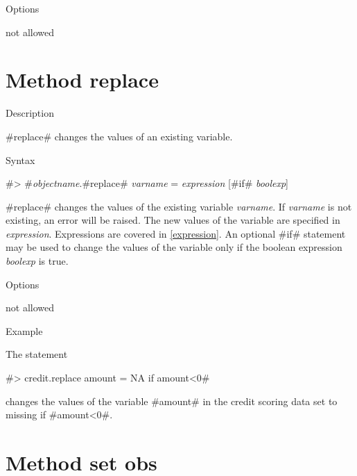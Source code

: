 \begin{stanza}{Options}

not allowed

\end{stanza}

\clearpage



\section{Method replace}
\label{replace} 



\begin{stanza}{Description}

{#replace# changes the values of an existing variable.}
\end{stanza}


\begin{stanza}{Syntax}

{#> #{\em objectname}.#replace# {\em varname} = {\em expression} [#if# {\em boolexp}]

#replace# changes the values of the existing variable {\em
varname}. If {\em varname} is not existing, an error will be
raised. The new values of the variable are specified in {\em
expression}. Expressions are covered in \autoref{expression}. An
optional #if# statement may be used to change the values of the
variable only if the boolean expression {\em boolexp} is true.}
\end{stanza}


\begin{stanza}{Options}

{not allowed}
\end{stanza}


\begin{stanza}{Example}

{The statement

#> credit.replace amount = NA if amount<0#

changes the values of the variable #amount# in the credit scoring
data set to missing if #amount<0#.}
\end{stanza}



\clearpage



\section{Method set obs}
\label{setobs}


